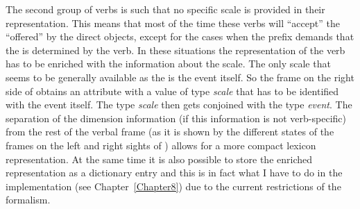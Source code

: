 
The second group of verbs is such that no specific scale is provided in their representation. This means that most of the time these verbs will ``accept'' the  ``offered'' by the direct objects, except for the cases when the prefix demands that the  is determined by the verb. In these situations the representation of the verb has to be enriched with the information about the scale. The only scale that seems to be generally available as the  is the event itself. So the frame on the right side of  obtains an attribute {\scshape\VERBDIM} with a value of type \textit{scale} that has to be identified with the event itself. The type \textit{scale} then gets conjoined with the type \textit{event}. The separation of the dimension information (if this information is not verb-specific) from the rest of the verbal frame (as it is shown by the different states of the frames on the left and right sights of ) allows for a more compact lexicon representation. At the same time it is also possible to store the enriched representation as a dictionary entry and this is in fact what I have to do in the implementation (see Chapter~\ref{Chapter8}) due to the current restrictions of the formalism. 
 


